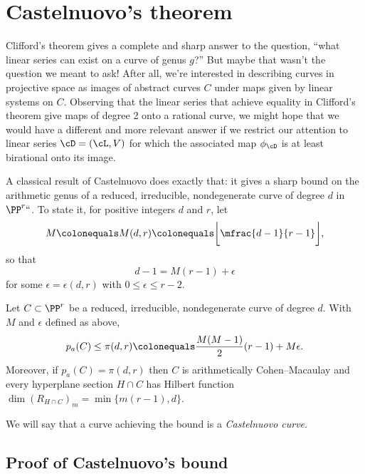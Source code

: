  \section{Castelnuovo's theorem}\label{CastelnuovoSection}

Clifford's theorem gives a complete and sharp answer to the question,
%
``what linear series can exist on a curve of genus $g$?''
But maybe that wasn't the question we meant to ask! After all, we're
interested in describing curves in projective space as images of abstract
curves $C$ under maps given by linear systems on $C$. Observing that
the linear series that achieve equality in
Clifford's theorem
%
give maps of degree 2 onto a rational curve,
 we might hope that we
would have a
 different and more relevant
answer if we
restrict our attention to linear series $\cD = (\cL,V)$ for which the
%
associated map $\phi_\cD$ is at least  birational onto its image.

A classical result of Castelnuovo does exactly that: it gives a sharp
bound on the
arithmetic genus
%
of a reduced, irreducible, nondegenerate
curve of degree $d$ in $\PP^r` `$. To state it, for positive integers $d$
and $r$, let
%
\label{def of M}
$$
 M \colonequals
M(d,r)
\colonequals
\biggl\lfloor\mfrac{d-1}{r-1}\biggr\rfloor,
$$
so that
$$
 d -1 = M(r-1) + \epsilon
$$
for some $\epsilon =
\epsilon(d,r)
$
 with $0 \leq \epsilon \leq r-2$.
%

\begin{theorem}\label{Castelnuovo's bound}
Let $C \subset \PP^r$ be a reduced, irreducible, nondegenerate curve of
%
degree $d$. With $M$ and $\epsilon$ defined
as above,
$$
p_a(C) \leq \pi(d,r) \colonequals  \frac{M(M-1)}{2}(r-1) + M\epsilon.
$$
Moreover, if $p_a(C) = \pi(d,r)$  then $C$ is arithmetically
%
Cohen--Macaulay and every hyperplane
section $H\cap C$ has
Hilbert function
%
$
\dim (R_{H\cap C})_{m} = \min\{m(r-1), d\}.
$
\end{theorem}

We will say that a curve achieving the bound is a \emph{Castelnuovo
%
curve}.

\subsection*{Proof of Castelnuovo's bound}

